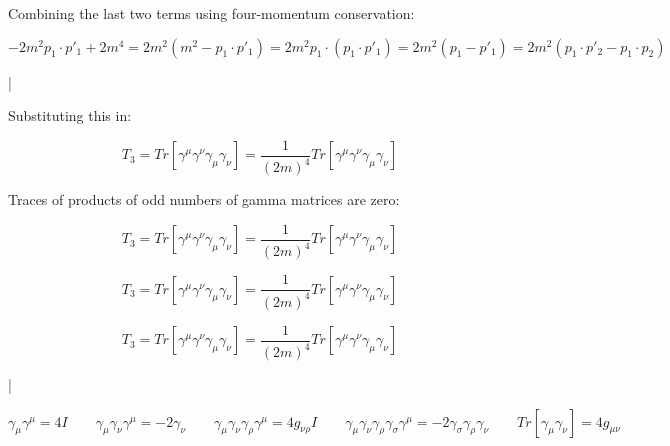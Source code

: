 \documentclass[a4]{article}
\begin{document}
    Combining the last two terms using four-momentum conservation:
    
    \begin{equation}
        -2 m^2 p_1 \cdot p'_1 + 2 m^4 = 2 m^2 (m^2 - p_1 \cdot p'_1) = 2 m^2 p_1 \cdot (p_1 \cdot p'_1) = 2 m^2 (p_1 - p'_1) = 2 m^2 (p_1 \cdot p'_2 - p_1 \cdot p_2)
    \end{equation}

    \begin{framed}
        |
    \end{framed}

    Substituting this in:

    \begin{equation}
        T_3 = Tr [\gamma^\mu \gamma^\nu \gamma_\mu \gamma_\nu] = \frac{1}{(2 m)^4} Tr [\gamma^\mu \gamma^\nu \gamma_\mu \gamma_\nu]
    \end{equation}

    Traces of products of odd numbers of gamma matrices are zero:

    \begin{equation}
        T_3 = Tr [\gamma^\mu \gamma^\nu \gamma_\mu \gamma_\nu] = \frac{1}{(2 m)^4} Tr [\gamma^\mu \gamma^\nu \gamma_\mu \gamma_\nu]
    \end{equation}

    \begin{equation}
        T_3 = Tr [\gamma^\mu \gamma^\nu \gamma_\mu \gamma_\nu] = \frac{1}{(2 m)^4} Tr [\gamma^\mu \gamma^\nu \gamma_\mu \gamma_\nu]
    \end{equation}

    \begin{equation}
        T_3 = Tr [\gamma^\mu \gamma^\nu \gamma_\mu \gamma_\nu] = \frac{1}{(2 m)^4} Tr [\gamma^\mu \gamma^\nu \gamma_\mu \gamma_\nu]
    \end{equation}

    \begin{framed}
        |
    \end{framed}

    \begin{equation}
        \gamma_\mu \gamma^\mu = 4 I \qquad \gamma_\mu \gamma_\nu \gamma^\mu = - 2 \gamma_\nu \qquad \gamma_\mu \gamma_\nu \gamma_\rho \gamma^\mu = 4 g_{\nu \rho} I \qquad \gamma_\mu \gamma_\nu \gamma_\rho \gamma_\sigma \gamma^\mu = - 2 \gamma_\sigma \gamma_\rho \gamma_\nu \qquad Tr [\gamma_\mu \gamma_\nu] = 4 g_{\mu \nu}
    \end{equation}
\end{document}
